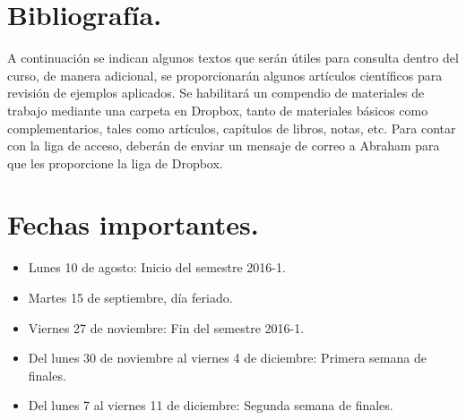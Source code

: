 \documentclass[12pt]{article}
\begin{document}
\section{Bibliografía.}
A continuación se indican algunos textos que serán útiles para consulta dentro del curso, de manera adicional, se proporcionarán algunos artículos científicos para revisión de ejemplos aplicados. Se habilitará un compendio de materiales de trabajo mediante una carpeta en Dropbox, tanto de materiales básicos como complementarios, tales como artículos, capítulos de libros, notas, etc. Para contar con la liga de acceso, deberán de enviar un mensaje de correo a Abraham para que les proporcione la liga de Dropbox.
\nocite{*}
\renewcommand{\refname}{Bibliografía básica.}

\section{Fechas importantes.}
\begin{itemize}
\item Lunes 10 de agosto: Inicio del semestre 2016-1.
\item Martes 15 de septiembre, día feriado.
\item Viernes 27 de noviembre: Fin del semestre 2016-1.
\item Del lunes 30 de noviembre  al viernes 4 de diciembre: Primera semana de finales.
\item Del lunes 7 al viernes 11 de diciembre: Segunda semana de finales.
\end{itemize}
\end{document}
